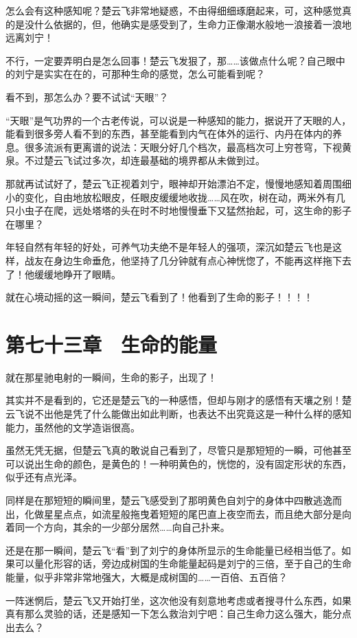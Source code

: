 怎么会有这种感知呢？楚云飞非常地疑惑，不由得细细琢磨起来，可，这种感觉真的是没什么依据的，但，他确实是感受到了，生命力正像潮水般地一浪接着一浪地远离刘宁！

不行，一定要弄明白是怎么回事！楚云飞发狠了，那……该做点什么呢？自己眼中的刘宁是实实在在的，可那种生命的感觉，怎么可能看到呢？

看不到，那怎么办？要不试试“天眼”？

“天眼”是气功界的一个古老传说，可以说是一种感知的能力，据说开了天眼的人，能看到很多旁人看不到的东西，甚至能看到内气在体外的运行、内丹在体内的养息。很多流派有更离谱的说法：天眼分好几个档次，最高档次可上穷苍穹，下视黄泉。不过楚云飞试过多次，却连最基础的境界都从未做到过。

那就再试试好了，楚云飞正视着刘宁，眼神却开始漂泊不定，慢慢地感知着周围细小的变化，自由地放松眼皮，任眼皮缓缓地收拢……风在吹，树在动，两米外有几只小虫子在爬，远处塔塔的头在时不时地慢慢垂下又猛然抬起，可，这生命的影子在哪里？

年轻自然有年轻的好处，可养气功夫绝不是年轻人的强项，深沉如楚云飞也是这样，战友在身边生命垂危，他坚持了几分钟就有点心神恍惚了，不能再这样拖下去了！他缓缓地睁开了眼睛。

就在心境动摇的这一瞬间，楚云飞看到了！他看到了生命的影子！！！！

\section{第七十三章　生命的能量}

就在那星驰电射的一瞬间，生命的影子，出现了！

其实并不是看到的，它还是楚云飞的一种感悟，但却与刚才的感悟有天壤之别！楚云飞说不出他是凭了什么能做出如此判断，也表达不出究竟这是一种什么样的感知能力，虽然他的文学造诣很高。

虽然无凭无据，但楚云飞真的敢说自己看到了，尽管只是那短短的一瞬，可他甚至可以说出生命的颜色，是黄色的！一种明黄色的，恍惚的，没有固定形状的东西，似乎还有点光泽。

同样是在那短短的瞬间里，楚云飞感受到了那明黄色自刘宁的身体中四散逃逸而出，化做星星点点，如流星般拖曳着短短的尾巴直上夜空而去，而且绝大部分是向着同一个方向，其余的一少部分居然……向自己扑来。

还是在那一瞬间，楚云飞“看”到了刘宁的身体所显示的生命能量已经相当低了。如果可以量化形容的话，旁边成树国的生命能量起码是刘宁的三倍，至于自己的生命能量，似乎非常非常地强大，大概是成树国的……一百倍、五百倍？

一阵迷惘后，楚云飞又开始打坐，这次他没有刻意地考虑或者搜寻什么东西，如果真有那么灵验的话，还是感知一下怎么救治刘宁吧：自己生命力这么强大，能分点出去么？

